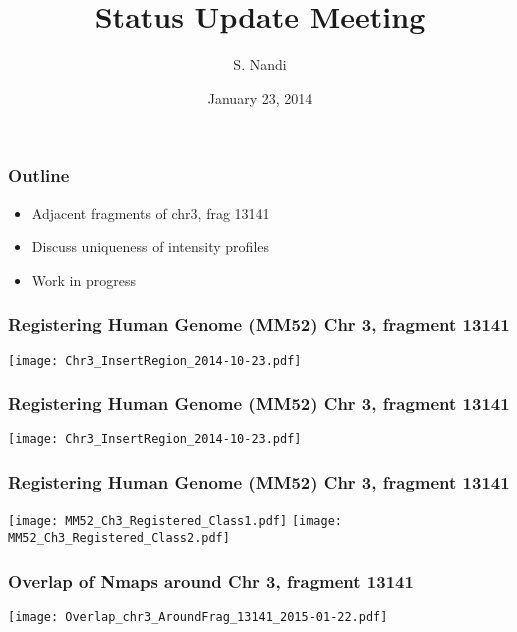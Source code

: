 \documentclass[10pt,dvipsnames,table]{beamer}
\title[Status Update Jan, 2015]{Status Update Meeting}
\author{S. Nandi}
\institute[LMCG]{LMCG \\
 University of Wisconsin-Madison}
\date{January 23, 2014}
\begin{document}
\setlength{\baselineskip}{16truept}
\frame{\maketitle}

\begin{frame}
\frametitle{Outline}
\begin{itemize}
\pause \item Adjacent fragments of chr3, frag 13141
\pause \item Discuss uniqueness of intensity profiles
\pause \item Work in progress
\end{itemize}
\end{frame}

\begin{frame}
\frametitle{Registering Human Genome (MM52) Chr 3, fragment 13141 }
\begin{center}
\texttt{[image: Chr3\_InsertRegion\_2014-10-23.pdf]} 
\end{center}
\end{frame}

\begin{frame}
\frametitle{Registering Human Genome (MM52) Chr 3, fragment 13141 }
\begin{center}
\texttt{[image: Chr3\_InsertRegion\_2014-10-23.pdf]} 
\end{center}
\end{frame}

\begin{frame}
\frametitle{Registering Human Genome (MM52) Chr 3, fragment 13141 }
\begin{center}
\texttt{[image: MM52\_Ch3\_Registered\_Class1.pdf]} 
\texttt{[image: MM52\_Ch3\_Registered\_Class2.pdf]} 
\end{center}
\end{frame}

\begin{frame}
\frametitle{Overlap of Nmaps around Chr 3, fragment 13141 }
\begin{center}
\texttt{[image: Overlap\_chr3\_AroundFrag\_13141\_2015-01-22.pdf]} 
\end{center}
\end{frame}
\end{document}
